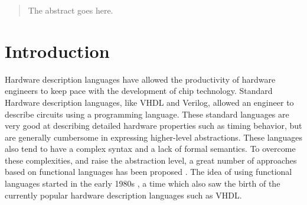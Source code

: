 \documentclass[conference]{IEEEtran}
\begin{document}




\maketitle


\begin{abstract}
The abstract goes here.
\end{abstract}





%
\IEEEpeerreviewmaketitle


\section{Introduction}
Hardware description languages have allowed the productivity of hardware engineers to keep pace with the development of chip technology. Standard Hardware description languages, like VHDL and Verilog, allowed an engineer to describe circuits using a programming language. These standard languages are very good at describing detailed hardware properties such as timing behavior, but are generally cumbersome in expressing higher-level abstractions. These languages also tend to have a complex syntax and a lack of formal semantics. To overcome these complexities, and raise the abstraction level, a great number of approaches based on functional languages has been proposed \cite{T-Ruby,Hydra,HML2,Hawk1,Lava,ForSyDe1,Wired,reFLect}. The idea of using functional languages started in the early 1980s \cite{Cardelli1981,muFP,DAISY,FHDL}, a time which also saw the birth of the currently popular hardware description languages such as VHDL.
\end{document}
